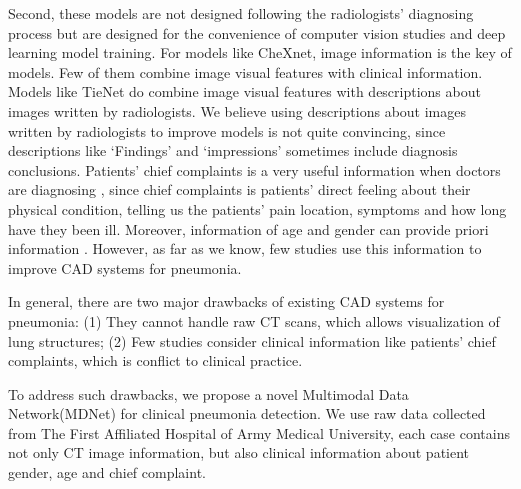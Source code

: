 \documentclass[journal]{IEEEtran}
\begin{document}
Second, these models are not designed following the radiologists' diagnosing process but are designed for the convenience of computer vision studies and deep learning model training. For models like CheXnet, image information is the key of models. Few of them combine image visual features with clinical information. Models like TieNet do combine image visual features with descriptions about images written by radiologists. We believe using descriptions about images written by radiologists to improve models is not quite convincing, since descriptions like `Findings' and `impressions' sometimes include diagnosis conclusions.
Patients' chief complaints is a very useful information when doctors are diagnosing \cite{wu2018master}, since chief complaints is patients' direct feeling about their physical condition, telling us the patients' pain location, symptoms and how long have they been ill. Moreover, information of age and gender can provide priori information\cite{xiaojian2011analysis} \cite{huang2014design}. However, as far as we know, few studies use this information to improve CAD systems for pneumonia. 

In general, there are two major drawbacks of existing CAD systems for pneumonia: (1) They cannot handle raw CT scans, which allows visualization of lung structures; (2) Few studies consider clinical information like patients' chief complaints, which is conflict to clinical practice.

To address such drawbacks, we propose a novel Multimodal Data Network(MDNet) for clinical pneumonia detection. We use raw data collected from The First Affiliated Hospital of Army Medical University, each case contains not only CT image information, but also clinical information about patient gender, age and chief complaint. 
\end{document}
